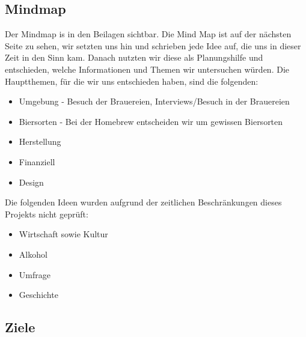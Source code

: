 \subsection{Mindmap}
Der Mindmap is in den Beilagen sichtbar.
Die Mind Map ist auf der nächsten Seite zu sehen, wir setzten uns hin und schrieben jede Idee auf, die uns in dieser Zeit in den Sinn kam. Danach nutzten wir diese als Planungshilfe und entschieden, welche Informationen und Themen wir untersuchen würden.
Die Hauptthemen, für die wir uns entschieden haben, sind die folgenden:
\begin{itemize}
   \item Umgebung - Besuch der Brauereien, Interviews/Besuch in der Brauereien
   \item Biersorten - Bei der Homebrew entscheiden wir um gewissen Biersorten
   \item Herstellung
   \item Finanziell
   \item Design
\end{itemize}
Die folgenden Ideen wurden aufgrund der zeitlichen Beschränkungen dieses Projekts nicht geprüft:
\begin{itemize}
   \item Wirtschaft sowie Kultur
   \item Alkohol
   \item Umfrage
   \item Geschichte
\end{itemize}


\subsection{Ziele} \label{introduction}

